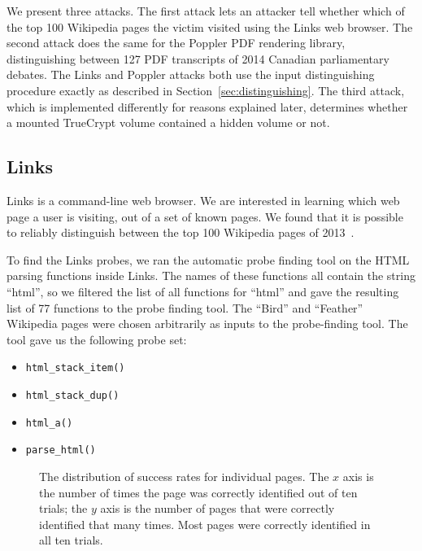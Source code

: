 \documentclass[letterpaper,twocolumn,10pt]{article}
\begin{document}
We present three attacks. The first attack lets an attacker tell whether which
of the top 100 Wikipedia pages the victim visited using the Links web browser.
The second attack does the same for the Poppler PDF rendering library,
distinguishing between 127 PDF transcripts of 2014 Canadian parliamentary
debates. The Links and Poppler attacks both use the input distinguishing
procedure exactly as described in Section~\ref{sec:distinguishing}. The third
attack, which is implemented differently for reasons explained later, determines whether a mounted TrueCrypt
volume contained a hidden volume or not.

\subsection{Links}

Links is a command-line web browser. We are interested in learning which web
page a user is visiting, out of a set of known pages. We found that it is
possible to reliably distinguish between the top 100 Wikipedia pages of
2013~\cite{wikitop2013}.

To find the Links probes, we ran the automatic probe finding tool on the HTML
parsing functions inside Links. The names of these functions all contain the
string ``html'', so we filtered the list of all functions for ``html'' and gave
the resulting list of 77 functions to the probe finding tool.
The ``Bird'' and
``Feather'' Wikipedia pages were chosen arbitrarily as inputs to
the probe-finding tool. The tool gave us the following probe set:

\begin{itemize}
\setlength{\itemsep}{0pt}
    \item \texttt{html\_stack\_item()}
    \item \texttt{html\_stack\_dup()}
    \item \texttt{html\_a()}
    \item \texttt{parse\_html()}
\end{itemize}


\begin{figure}[h]
    \centering
    
    \vspace*{-2em}
    \caption{The distribution of success rates for individual pages. The $x$
        axis is the number of times the page was correctly identified out of ten
        trials; the $y$ axis is the number of pages that were correctly
        identified that many times. Most pages were correctly identified in all
        ten trials.}
    \vspace*{-1em}
    \label{figure:distribution}
\end{figure}
\end{document}
